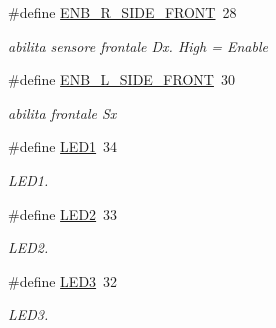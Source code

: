 \begin{DoxyCompactItemize}
\mbox{\label{ari_pi__2_d_c__esp__08_8ino_a551793442f7ac915171c5478f3df0955}} 
\#define \mbox{\hyperlink{ari_pi__2_d_c__esp__08_8ino_a551793442f7ac915171c5478f3df0955}{E\+N\+B\+\_\+\+R\+\_\+\+S\+I\+D\+E\+\_\+\+F\+R\+O\+NT}}~28
\begin{DoxyCompactList}\small\item\em abilita sensore frontale Dx. High = Enable \end{DoxyCompactList}\item 
\mbox{\label{ari_pi__2_d_c__esp__08_8ino_a5709a7b011efe9859445cf4a2c0646ea}} 
\#define \mbox{\hyperlink{ari_pi__2_d_c__esp__08_8ino_a5709a7b011efe9859445cf4a2c0646ea}{E\+N\+B\+\_\+\+L\+\_\+\+S\+I\+D\+E\+\_\+\+F\+R\+O\+NT}}~30
\begin{DoxyCompactList}\small\item\em abilita frontale Sx \end{DoxyCompactList}\item 
\mbox{\label{ari_pi__2_d_c__esp__08_8ino_a8aa85ae9867fabf70ec72cd3bf6fb6b9}} 
\#define \mbox{\hyperlink{ari_pi__2_d_c__esp__08_8ino_a8aa85ae9867fabf70ec72cd3bf6fb6b9}{L\+E\+D1}}~34
\begin{DoxyCompactList}\small\item\em L\+E\+D1. \end{DoxyCompactList}\item 
\mbox{\label{ari_pi__2_d_c__esp__08_8ino_ad09fe5bf321b9a2de26bd5e5b9af6424}} 
\#define \mbox{\hyperlink{ari_pi__2_d_c__esp__08_8ino_ad09fe5bf321b9a2de26bd5e5b9af6424}{L\+E\+D2}}~33
\begin{DoxyCompactList}\small\item\em L\+E\+D2. \end{DoxyCompactList}\item 
\mbox{\label{ari_pi__2_d_c__esp__08_8ino_a4b7ff8e253a7412f83deba3a447028a8}} 
\#define \mbox{\hyperlink{ari_pi__2_d_c__esp__08_8ino_a4b7ff8e253a7412f83deba3a447028a8}{L\+E\+D3}}~32
\begin{DoxyCompactList}\small\item\em L\+E\+D3. \end{DoxyCompactList}\item 
\mbox{\label{ari_pi__2_d_c__esp__08_8ino_a49ba715e713d99d1a5c20429dacaf073}} 

\end{DoxyCompactItemize}
